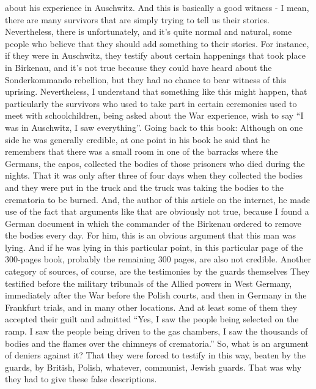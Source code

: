 about his experience in Auschwitz. And this is basically a good witness - I mean, there are many survivors that are simply trying to tell us their stories. Nevertheless, there is unfortunately, and it's quite normal and natural, some people who believe that they should add something to their stories. For instance, if they were in Auschwitz, they testify about certain happenings that took place in Birkenau, and it’s not true because they could have heard about the Sonderkommando rebellion, but they had no chance to bear witness of this uprising. Nevertheless, I understand that something like this might happen, that particularly the survivors who used to take part in certain ceremonies used to meet with schoolchildren, being asked about the War experience, wish to say “I was in Auschwitz, I saw everything”. Going back to this book: Although on one side he was generally credible, at one point in his book he said that he remembers that there was a small room in one of the barracks where the Germans, the capos, collected the bodies of those prisoners who died during the nights. That it was only after three of four days when they collected the bodies and they were put in the truck and the truck was taking the bodies to the crematoria to be burned. And, the author of this article on the internet, he made use of the fact that arguments like that are obviously not true, because I found a German document in which the commander of the Birkenau ordered to remove the bodies every day. For him, this is an obvious argument that this man was lying. And if he was lying in this particular point, in this particular page of the 300-pages book, probably the remaining 300 pages, are also not credible. 
Another category of sources, of course, are the testimonies by the guards themselves They testified before the military tribunals of the Allied powers in West Germany, immediately after the War before the Polish courts, and then in Germany in the Frankfurt trials, and in many other locations. And at least some of them they accepted their guilt and admitted “Yes, I saw the people being selected on the ramp. I saw the people being driven to the gas chambers, I saw the thousands of bodies and the flames over the chimneys of crematoria.” So, what is an argument of deniers against it? That they were forced to testify in this way, beaten by the guards, by British, Polish, whatever, communist, Jewish guards. That was why they had to give these false descriptions. 
